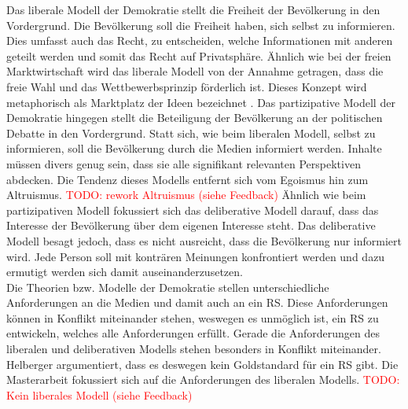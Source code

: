 Das liberale Modell der Demokratie stellt die Freiheit der Bevölkerung in den Vordergrund.
Die Bevölkerung soll die Freiheit haben, sich selbst zu informieren.
Dies umfasst auch das Recht, zu entscheiden, welche Informationen mit anderen geteilt werden und somit das Recht auf Privatsphäre.
Ähnlich wie bei der freien Marktwirtschaft wird das liberale Modell von der Annahme getragen, dass die freie Wahl und das Wettbewerbsprinzip förderlich ist.
Dieses Konzept wird metaphorisch als \glqq Marktplatz der Ideen\grqq{} bezeichnet \cite{marketplace-ideas}.
Das partizipative Modell der Demokratie hingegen stellt die Beteiligung der Bevölkerung an der politischen Debatte in den Vordergrund.
Statt sich, wie beim liberalen Modell, selbst zu informieren, soll die Bevölkerung durch die Medien informiert werden.
Inhalte müssen divers genug sein, dass sie alle signifikant relevanten Perspektiven abdecken.
Die Tendenz dieses Modells entfernt sich vom Egoismus hin zum Altruismus. \textcolor{red}{TODO: rework Altruismus (siehe Feedback)}
Ähnlich wie beim partizipativen Modell fokussiert sich das deliberative Modell darauf, dass das Interesse der Bevölkerung über dem eigenen Interesse steht.
Das deliberative Modell besagt jedoch, dass es nicht ausreicht, dass die Bevölkerung nur informiert wird.
Jede Person soll mit konträren Meinungen konfrontiert werden und dazu ermutigt werden sich damit auseinanderzusetzen. \\

Die Theorien bzw. Modelle der Demokratie stellen unterschiedliche Anforderungen an die Medien und damit auch an ein \ac{RS}.
Diese Anforderungen können in Konflikt miteinander stehen, weswegen es unmöglich ist, ein \ac{RS} zu entwickeln, welches alle Anforderungen erfüllt.
Gerade die Anforderungen des liberalen und deliberativen Modells stehen besonders in Konflikt miteinander.
Helberger argumentiert, dass es deswegen kein Goldstandard für ein \ac{RS} gibt.
Die Masterarbeit fokussiert sich auf die Anforderungen des liberalen Modells. \textcolor{red}{TODO: Kein liberales Modell (siehe Feedback)}

